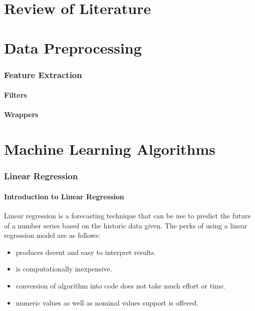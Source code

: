 \documentclass[12pt]{article}
\begin{document}
\newpage
\part{Review of Literature}
\iffalse
Source : https://www.ncbi.nlm.nih.gov/pmc/articles/PMC5851210/
\fi

\iffalse
PDF :
Andreas Holzinger 1,2( B )

Holzinger Group, HCI-KDD, Institute for Medical Informatics,
Statistics and Documentation, Medical University Graz, Graz, Austria
a.holzinger@hci-kdd.org

Institute for Information Systems and Computer Media,
Graz University of Technology, Graz, Austria
\fi



\newpage
\part{Data Preprocessing}
\section{Feature Extraction}
\subsection{Filters}
\subsection{Wrappers}
\newpage
\part{Machine Learning Algorithms}
\newpage
\section{Linear Regression}
\subsection{Introduction to Linear Regression}
Linear regression is a forecasting technique that can be use to predict the future of a number series based on the historic data given. The perks of using a linear regression model are as follows:

\begin{itemize}
  \item produces decent and  easy to interpret results.
  \item is computationally inexpensive.
  \item conversion of algorithm into code does not take much effort or time.
  \item numeric values as well as nominal values support is offered.
\end{itemize}
\end{document}
